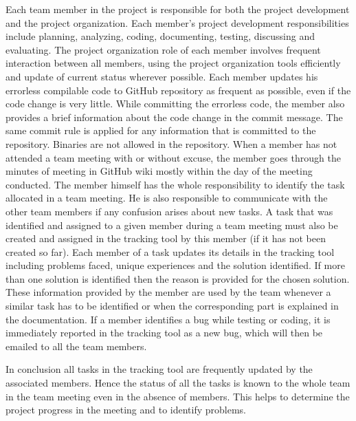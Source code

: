 Each team member in the project is responsible for both the project development and the project organization.
Each member's project development responsibilities include planning, analyzing, coding, documenting, testing, discussing and evaluating.
The project organization role of each member involves frequent interaction between all members, using
the project organization tools efficiently and update of current status wherever possible.
Each member updates his errorless compilable code to GitHub repository as frequent as possible, even if the code change is very little.
While committing the errorless code, the member also provides a brief information about the code change in the commit message.
The same commit rule is applied for any information that is committed to the repository.
Binaries are not allowed in the repository.
When a member has not attended a team meeting with or without excuse, the member
goes through the minutes of meeting in GitHub wiki mostly within the day of the meeting conducted.
The member himself has the whole responsibility to identify the task allocated in a team meeting.
He is also responsible to communicate with the other team members if any confusion arises about new tasks.
A task that was identified and assigned to a given member during a team meeting must also be created and assigned in the tracking tool by this member (if it has not been created so far).
Each member of a task updates its details in the tracking tool including problems faced, unique experiences and the solution identified.
If more than one solution is identified then the reason is provided for the chosen solution.
These information provided by the member are used by the team whenever a similar task has to be identified or when the corresponding part is explained in the documentation.
If a member identifies a bug while testing or coding, it is immediately reported in the tracking tool as a new bug, which will then be emailed to all the team members.

In conclusion all tasks in the tracking tool are frequently updated by the associated members.
Hence the status of all the tasks is known to the whole team in the team meeting even in the absence of members.
This helps to determine the project progress in the meeting and to identify problems.

\vspace{1cm}


